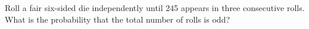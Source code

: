 Roll a fair six-sided die independently until 245 appears in three consecutive rolls. What is the probability that the total number of rolls is odd?
